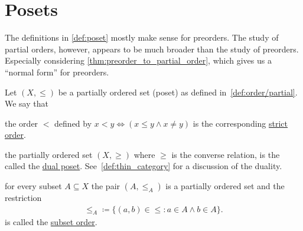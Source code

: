 \section{Posets}\label{sec:posets}

\begin{note}\label{note:preodered_sets_as_posets}
  The definitions in \cref{def:poset} mostly make sense for preorders. The study of partial orders, however, appears to be much broader than the study of preorders. Especially considering \cref{thm:preorder_to_partial_order}, which gives us a \enquote{normal form} for preorders.
\end{note}

\begin{definition}\label{def:poset}
  Let $(X, \leq)$ be a partially ordered set (poset) as defined in~\cref{def:order/partial}. We say that
  \begin{defenum}
    \item\label{def:poset/strict_order} the order $<$ defined by $x < y \iff (x \leq y \land x \neq y)$ is the corresponding \uline{strict order}.

    \item\label{def:poset/dual} the partially ordered set $(X, \geq)$ where $\geq$ is the converse relation, is the called the \uline{dual poset}. See~\cref{def:thin_category} for a discussion of the duality.

    \item\label{def:poset/subset_order} for every subset $A \subseteq X$ the pair $(A, \leq_A)$ is a partially ordered set and the restriction
    \begin{align*}
      \leq_A \coloneqq \{ (a, b) \in \leq \colon a \in A \land b \in A \}.
    \end{align*}
    is called the \uline{subset order}.


\end{defenum}
\end{definition}
